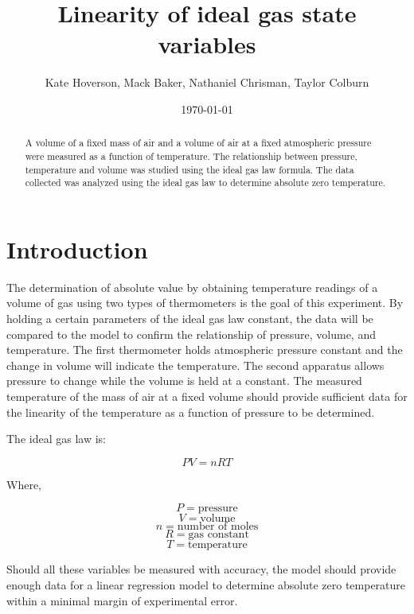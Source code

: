 \documentclass{revtex4-1}
\author{Kate Hoverson, Mack Baker, Nathaniel Chrisman, Taylor Colburn}
\title{Linearity of ideal gas state variables}
\date{\today}
\begin{document}
  \maketitle
  \begin{abstract}
    A volume of a fixed mass of air and a volume of air at a fixed atmospheric pressure were measured as a function of temperature. The relationship between pressure, temperature and volume was studied using the ideal gas law formula. The data collected was analyzed using the ideal gas law to determine absolute zero temperature.
  \end{abstract}
  \section{Introduction}

  The determination of absolute value by obtaining temperature readings of a volume of gas using two types of thermometers is the goal of this experiment.  By holding a certain parameters of the ideal gas law constant, the data will be compared to the model to confirm the relationship of pressure, volume, and temperature.  The first thermometer holds atmospheric pressure constant and the change in volume will indicate the temperature. The second apparatus allows pressure to change while the volume is held at a constant. The measured temperature of the mass of air at a fixed volume should provide sufficient data for the linearity of the temperature as a function of pressure to be determined.

  The ideal gas law is:

  $$PV = nRT$$

  Where,

  $$P = \text{pressure}$$
  $$V = \text{volume}$$
  $$n = \text{number of moles}$$
  $$R = \text{gas constant}$$
  $$T = \text{temperature}$$


Should all these variables be measured with accuracy, the model should provide enough data for a linear regression model to determine absolute zero temperature within a minimal margin of experimental error.
\end{document}
